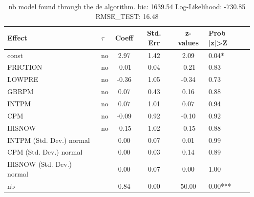 \begin{table}
	\caption{nb model found through the de algorithm. bic: 1639.54 Log-Likelihood: -730.85 RMSE_TEST: 16.48}
	\begin{center}
		\begin{tabular}{|l|l|c|c|c|l|}
			\hline
			Effect & $\tau$ & Coeff & Std. Err & z-values & Prob |z|>Z \\
			\hline
			const & no & 2.97 & 1.42 & 2.09 & 0.04* \\
			\hline
			FRICTION & no & -0.01 & 0.04 & -0.21 & 0.83 \\
			\hline
			LOWPRE & no & -0.36 & 1.05 & -0.34 & 0.73 \\
			\hline
			GBRPM & no & 0.07 & 0.43 & 0.16 & 0.88 \\
			\hline
			INTPM & no & 0.07 & 1.01 & 0.07 & 0.94 \\
			\hline
			CPM & no & -0.09 & 0.92 & -0.10 & 0.92 \\
			\hline
			HISNOW & no & -0.15 & 1.02 & -0.15 & 0.88 \\
			\hline
			INTPM (Std. Dev.) normal &  & 0.00 & 0.07 & 0.01 & 0.99 \\
			\hline
			CPM (Std. Dev.) normal &  & 0.00 & 0.03 & 0.14 & 0.89 \\
			\hline
			HISNOW (Std. Dev.) normal &  & 0.00 & 0.07 & 0.00 & 1.00 \\
			\hline
			nb &  & 0.84 & 0.00 & 50.00 & 0.00*** \\
			\hline
		\end{tabular}
	\end{center}
\end{table}